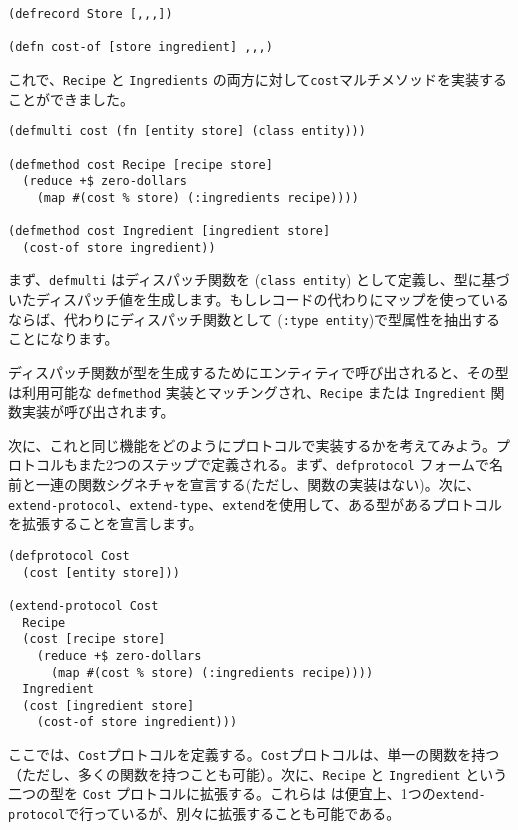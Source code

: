 \begin{lstlisting}[numbers=none]
(defrecord Store [,,,])

(defn cost-of [store ingredient] ,,,)
\end{lstlisting}

これで、\texttt{Recipe} と \texttt{Ingredients} の両方に対して\texttt{cost}マルチメソッドを実装することができました。

\begin{lstlisting}[numbers=none]
(defmulti cost (fn [entity store] (class entity)))

(defmethod cost Recipe [recipe store]
  (reduce +$ zero-dollars
    (map #(cost % store) (:ingredients recipe))))

(defmethod cost Ingredient [ingredient store]
  (cost-of store ingredient))
\end{lstlisting}

まず、\texttt{defmulti} はディスパッチ関数を (\texttt{class entity}) として定義し、型に基づいたディスパッチ値を生成します。もしレコードの代わりにマップを使っているならば、代わりにディスパッチ関数として (\texttt{:type entity})で型属性を抽出することになります。

ディスパッチ関数が型を生成するためにエンティティで呼び出されると、その型は利用可能な \texttt{defmethod} 実装とマッチングされ、\texttt{Recipe} または \texttt{Ingredient} 関数実装が呼び出されます。

次に、これと同じ機能をどのようにプロトコルで実装するかを考えてみよう。プロトコルもまた2つのステップで定義される。まず、\texttt{defprotocol} フォームで名前と一連の関数シグネチャを宣言する(ただし、関数の実装はない)。次に、\texttt{extend-protocol}、\texttt{extend-type}、\texttt{extend}を使用して、ある型があるプロトコルを拡張することを宣言します。

\begin{lstlisting}[numbers=none]
(defprotocol Cost
  (cost [entity store]))

(extend-protocol Cost
  Recipe
  (cost [recipe store]
    (reduce +$ zero-dollars
      (map #(cost % store) (:ingredients recipe))))
  Ingredient
  (cost [ingredient store]
    (cost-of store ingredient)))
\end{lstlisting}

ここでは、\texttt{Cost}プロトコルを定義する。\texttt{Cost}プロトコルは、単一の関数を持つ（ただし、多くの関数を持つことも可能）。次に、\texttt{Recipe} と \texttt{Ingredient} という二つの型を \texttt{Cost} プロトコルに拡張する。これらは は便宜上、1つの\texttt{extend-protocol}で行っているが、別々に拡張することも可能である。

